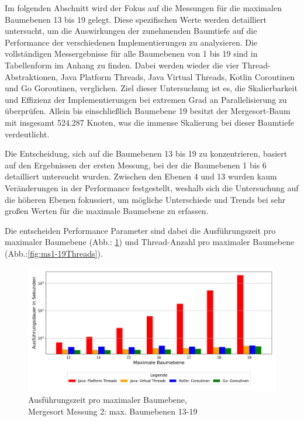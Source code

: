 \documentclass[fontsize=12pt,paper=a4,twoside=semi,parskip=half-,headsepline,headinclude]{scrreprt}
\begin{document}
Im folgenden Abschnitt wird der Fokus auf die Messungen für die maximalen Baumebenen 13 bis 19 gelegt. Diese spezifischen Werte werden detailliert untersucht, um die Auswirkungen der zunehmenden Baumtiefe auf die Performance der verschiedenen Implementierungen zu analysieren. Die vollständigen Messergebnisse für alle  Baumebenen von 1 bis 19 sind in Tabellenform im Anhang zu finden. Dabei werden wieder die vier Thread-Abstraktionen, Java Platform Threads, Java Virtual Threads, Kotlin Coroutinen und Go Goroutinen, verglichen. Ziel dieser Untersuchung ist es, die Skalierbarkeit und Effizienz der Implementierungen bei extremen Grad an Parallelisierung zu überprüfen. Allein bis einschließlich Baumebene 19 besitzt der Mergesort-Baum mit insgesamt 524.287 Knoten, was die immense Skalierung bei dieser Baumtiefe verdeutlicht.

Die Entscheidung, sich auf die Baumebenen 13 bis 19 zu konzentrieren, basiert auf den Ergebnissen der ersten Messung, bei der die Baumebenen 1 bis 6 detailliert untersucht wurden. Zwischen den Ebenen 4 und 13 wurden kaum Veränderungen in der Performance festgestellt, weshalb sich die Untersuchung auf die höheren Ebenen  fokussiert, um mögliche Unterschiede und Trends bei sehr großen Werten für die maximale Baumebene zu erfassen.

Die entscheiden Performance Parameter sind dabei die Ausführungszeit pro maximaler Baumebene (Abb.: \ref{fig:ms1-19Zeit}) und Thread-Anzahl pro maximaler Baumebene (Abb.:\ref{fig:ms1-19Threads}).

\begin{figure}[H]
	\centering
	\includegraphics[scale=0.5]{figures/mergesort/Maximalebauebenen1-19_pvcg/execution_time_plot.png}
	\caption{Ausführungszeit pro maximaler Baumebene,\\ Mergesort Messung 2: max. Baumebenen 13-19}
	\label{fig:ms1-19Zeit}
\end{figure}
\end{document}
